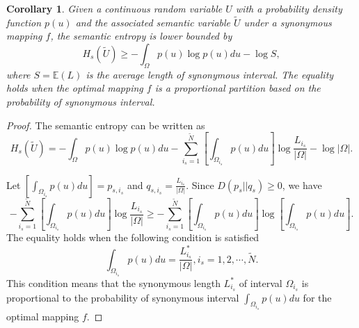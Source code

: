 \documentclass[12pt, draftclsnofoot,onecolumn]{IEEEtran}
\newtheorem{corollary}{\bf{Corollary}}
\begin{document}
\begin{corollary}\label{SemEntropy_LB}
Given a continuous random variable $U$ with a probability density function $p(u)$ and the associated semantic variable $\tilde{U}$ under a synonymous mapping $f$, the semantic entropy is lower bounded by
\begin{equation}\label{LB_semantic_entropy}
H_s(\tilde{U})\geq -\int_{\Omega} p(u)\log p(u)du-\log S,
\end{equation}
where $S=\mathbb{E}( L)$ is the average length of synonymous interval. The equality holds when the optimal mapping $f$ is a proportional partition based on the probability of synonymous interval.
\end{corollary}
\begin{proof}
The semantic entropy can be written as
\begin{equation}
H_s(\tilde{U})=-\int_{\Omega} p(u)\log p(u) du -\sum_{i_s=1}^{\tilde{N}}\left[ \int_{\Omega_{i_s}} p(u) du \right] \log \frac{L_{i_s}}{|\Omega|}-\log |\Omega|.
\end{equation}

Let $\left[ \int_{\Omega_{i_s}} p(u) du \right]=p_{s,i_s}$ and $q_{s,i_s}=\frac{L_{i_s}}{|\Omega|}$. Since $D(p_s||q_s)\geq 0$, we have
\begin{equation}
-\sum_{i_s=1}^{\tilde{N}}\left[ \int_{\Omega_{i_s}} p(u) du \right] \log \frac{L_{i_s}}{|\Omega|}\geq -\sum_{i_s=1}^{\tilde{N}}\left[ \int_{\Omega_{i_s}} p(u) du \right] \log \left[ \int_{\Omega_{i_s}} p(u) du \right].
\end{equation}
The equality holds when the following condition is satisfied
\begin{equation}\label{condition1}
\int_{\Omega_{i_s}} p(u) du=\frac{L^{*}_{i_s}}{|\Omega|},  i_s=1,2,\cdots, \tilde{N}.
\end{equation}
This condition means that the synonymous length $L^{*}_{i_s}$ of interval $\Omega_{i_s}$ is proportional to the probability of synonymous interval $\int_{\Omega_{i_s}} p(u) du $ for the optimal mapping $f$.



\end{proof}
\end{document}
